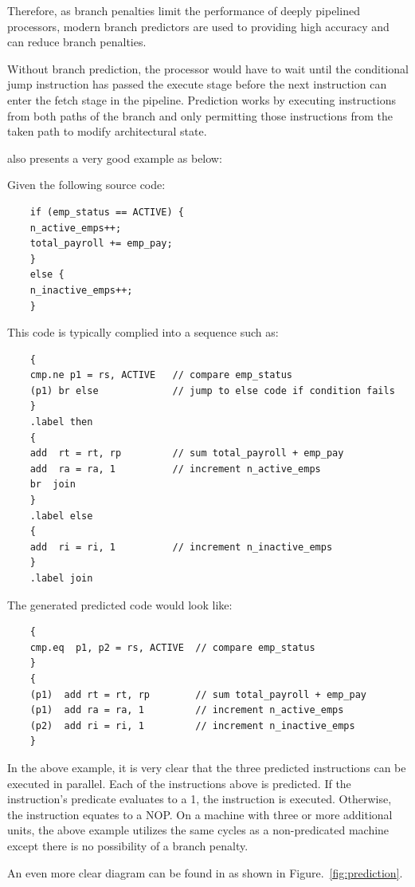 \documentclass[doc,natbib,12pt]{apa6}
\begin{document}
	Therefore, as branch penalties limit the performance of deeply pipelined processors, modern branch predictors are used to providing high accuracy and can reduce branch penalties.
	
	Without branch prediction, the processor would have to wait until the conditional jump instruction has passed the execute stage before the next instruction can enter the fetch stage in the pipeline. Prediction works by executing instructions from both paths of the branch and only permitting those instructions from the taken path to modify architectural state. \citep{Vinyard2000}
	
	\citep{Vinyard2000} also presents a very good example as below:
	
	Given the following source code:
	\begin{lstlisting}
	if (emp_status == ACTIVE) {
	n_active_emps++;
	total_payroll += emp_pay;
	}
	else {
	n_inactive_emps++;
	}
	\end{lstlisting}
	This code is typically complied into a sequence such as:
	\begin{lstlisting}
	{
	cmp.ne p1 = rs, ACTIVE   // compare emp_status
	(p1) br else             // jump to else code if condition fails
	}
	.label then
	{
	add  rt = rt, rp         // sum total_payroll + emp_pay
	add  ra = ra, 1          // increment n_active_emps
	br  join
	}
	.label else
	{
	add  ri = ri, 1          // increment n_inactive_emps
	}
	.label join
	\end{lstlisting}
	The generated predicted code would look like:
	\begin{lstlisting}
	{
	cmp.eq  p1, p2 = rs, ACTIVE  // compare emp_status
	} 
	{
	(p1)  add rt = rt, rp        // sum total_payroll + emp_pay
	(p1)  add ra = ra, 1         // increment n_active_emps
	(p2)  add ri = ri, 1         // increment n_inactive_emps
	}
	\end{lstlisting}
	
	In the above example, it is very clear that the three predicted instructions can be executed in parallel. Each of the instructions above is predicted. If the instruction's predicate evaluates to a 1, the instruction is executed. Otherwise, the instruction equates to a NOP. On a machine with three or more additional units, the above example utilizes the same cycles as a non-predicated machine except there is no possibility of a branch penalty. \citep{Vinyard2000}
	
	An even more clear diagram can be found in \citep{Byte} as shown in Figure.~\vref{fig:prediction}.
	
\end{document}
